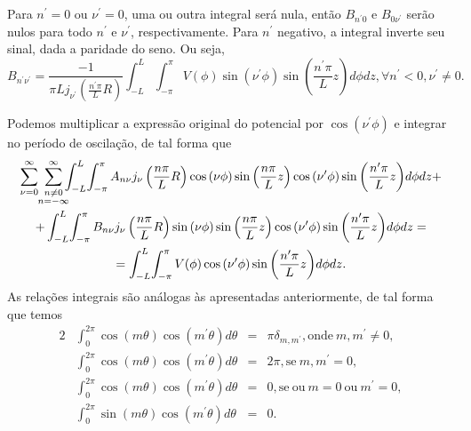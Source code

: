 \documentclass{article}
\begin{document}
Para $n^{\prime} = 0$ ou $\nu^{\prime} = 0$, uma ou outra integral será nula, então $B_{n^{\prime}0}$ e $B_{0\nu^{\prime}}$ serão nulos para
todo $n^{\prime}$ e $\nu^{\prime}$, respectivamente. Para $n^{\prime}$ negativo, a integral inverte seu sinal, dada a paridade do seno. Ou seja,
\begin{equation}
 B_{n^{\prime} \nu^{\prime}} = \frac{-1}{\pi L j_{\nu^{\prime}}\left( \frac{n^{\prime} \pi}{L} R \right)}\int_{-L}^{L} \!  \int_{-\pi}^{\pi}
 V(\phi) \sin{(\nu^{\prime} \phi)} \sin{\left( \frac{n^{\prime} \pi}{L}z \right)} d\phi dz, \forall n^{\prime} < 0, \nu^{\prime} \neq 0 \mathrm{.}
\end{equation}

Podemos multiplicar a expressão original do potencial por $\cos{(\nu^{\prime}\phi)}$ e integrar no período de oscilação, de tal forma que
\begin{multline}
 \sum_{\nu = 0}^{\infty} \ \sum_{\mathclap{\substack{n \neq 0 \\ n = -\infty}}}^{\infty}
 \int_{-L}^{L} \! \int_{-\pi}^{\pi}
 A_{n \nu} j_{\nu}\left( \frac{n \pi}{L} R \right) \cos{(\nu \phi)} \sin{\left( \frac{n \pi}{L}z \right)} \cos{(\nu^{\prime} \phi)}
 \sin{\left( \frac{n^{\prime} \pi}{L}z \right)} d\phi dz+ \\
 + \int_{-L}^{L} \!  \int_{-\pi}^{\pi}
 B_{n \nu} j_{\nu}\left( \frac{n \pi}{L} R \right) \sin{(\nu \phi)} \sin{\left( \frac{n \pi}{L}z \right)} \cos{(\nu^{\prime} \phi)}
 \sin{\left( \frac{n^{\prime} \pi}{L}z \right)} d\phi dz = \\
 = \int_{-L}^{L} \!  \int_{-\pi}^{\pi}
 V(\phi) \cos{(\nu^{\prime} \phi)} \sin{\left( \frac{n^{\prime} \pi}{L}z \right)} d\phi dz \mathrm{.}
\end{multline}
As relações integrais são análogas às apresentadas anteriormente, de tal forma que temos
\begin{alignat}{2}
 &\int_{0}^{2 \pi} \cos{(m \theta)} \cos{(m^{\prime}\theta)} d\theta &=& \pi \delta_{m,m^{\prime}}, \mathrm{onde\ }m, m^{\prime} \neq 0 \mathrm{,}\\
 &\int_{0}^{2 \pi} \cos{(m \theta)} \cos{(m^{\prime}\theta)} d\theta &=& 2\pi, \mathrm{se\ }m, m^{\prime} = 0 \mathrm{,}\\
 &\int_{0}^{2 \pi} \cos{(m \theta)} \cos{(m^{\prime}\theta)} d\theta &=& 0, \mathrm{se\ ou\ }m = 0 \mathrm{\ ou\ } m^{\prime} = 0 \mathrm{,}\\
 &\int_{0}^{2 \pi} \sin{(m \theta)} \cos{(m^{\prime}\theta)} d\theta &=& 0\mathrm{.}
\end{alignat}
\end{document}
